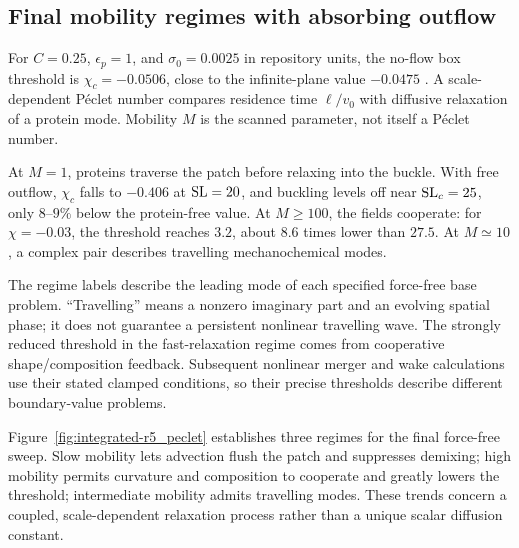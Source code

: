\subsection{Final mobility regimes with absorbing outflow}


For $C=0.25$, $\epsilon_p=1$, and $\sigma_0=0.0025$ in repository units, the no-flow box threshold is $\chi_c=-0.0506$, close to the infinite-plane value $-0.0475$ \cite{leibler}. A scale-dependent P\'eclet number compares residence time $\ell/v_0$ with diffusive relaxation of a protein mode. Mobility $M$ is the scanned parameter, not itself a P\'eclet number.

At $M=1$, proteins traverse the patch before relaxing into the buckle. With free outflow, $\chi_c$ falls to $-0.406$ at $\mathrm{SL}=20$, and buckling levels off near $\mathrm{SL}_c=25$, only $8$--$9\%$ below the protein-free value. At $M\geq100$, the fields cooperate: for $\chi=-0.03$, the threshold reaches $3.2$, about $8.6$ times lower than $27.5$. At $M\simeq10$, a complex pair describes travelling mechanochemical modes.


The regime labels describe the leading mode of each specified force-free base problem. ``Travelling'' means a nonzero imaginary part and an evolving spatial phase; it does not guarantee a persistent nonlinear travelling wave. The strongly reduced threshold in the fast-relaxation regime comes from cooperative shape/composition feedback. Subsequent nonlinear merger and wake calculations use their stated clamped conditions, so their precise thresholds describe different boundary-value problems.




Figure~\ref{fig:integrated-r5_peclet} establishes three regimes for the final force-free sweep. Slow mobility lets advection flush the patch and suppresses demixing; high mobility permits curvature and composition to cooperate and greatly lowers the threshold; intermediate mobility admits travelling modes. These trends concern a coupled, scale-dependent relaxation process rather than a unique scalar diffusion constant.



